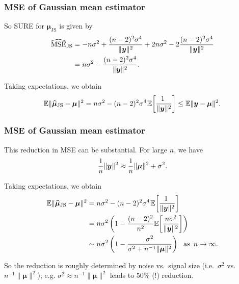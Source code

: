 \documentclass[18pt, handout]{beamer}
\newcommand{\defineTightSpacing}{%
	\setlength{\abovedisplayskip}{.25\baselineskip}%
	\setlength{\belowdisplayskip}{.25\baselineskip}%
}
\renewcommand{\textsc}[1]{{\small \MakeUppercase{#1}}}
\newcommand{\thinnerspace}{\mskip.5\thinmuskip}
\newcommand{\expectation}{\mathbb{E}}
\newcommand{\by}{\bm{y}}
\newcommand{\bmu}{\bm{\mu}}
\begin{document}
\begin{frame}
\frametitle{M{\normalsize SE} of Gaussian mean estimator}
So \textsc{SURE} for $\widehat{\bmu}_{\mathrm{JS}}$ is given by
\begin{equation*} \defineTightSpacing%
\begin{aligned}
\widehat{\operatorname{MSE}}_{\mathrm{JS}}
	&= - n \sigma^2 
		+ \frac{(n - 2)^2 \sigma^4}{\| \by \|^2}
		+ 2 n \sigma^2 
		- 2 \frac{(n - 2)^2 \sigma^4}{\| \by \|^2} \\
	&= n \sigma^2 - \frac{(n - 2)^2 \sigma^4}{\| \by \|^2}.
\end{aligned}
\end{equation*}

Taking expectations, we obtain
\begin{equation*} \defineTightSpacing%
\expectation \| \widehat{\bmu}_{\mathrm{JS}} - \bmu \|^2 
	= n \sigma^2  - (n - 2)^2 \sigma^4 \thinnerspace \expectation\!\left[ \frac{\!\!1}{\| \by \|^2} \right] 
	\leq \expectation \| \by - \bmu \|^2.
\end{equation*}
\end{frame}

\begin{frame}
\frametitle{M{\normalsize SE} of Gaussian mean estimator}
This reduction in \textsc{MSE} can be substantial.
For large $n$, we have
\begin{equation*} \defineTightSpacing%
\frac{1}{n} \| \by \|^2 \approx \frac{1}{n} \| \bmu \|^2 + \sigma^2.
\end{equation*}

Taking expectations, we obtain
\begin{equation*} \defineTightSpacing%
\begin{aligned}
\expectation \| \widehat{\bmu}_{\mathrm{JS}} - \bmu \|^2 
	&= n \sigma^2  - (n - 2)^2 \sigma^4 \thinnerspace \expectation\!\left[ \frac{\!\!1}{\| \by \|^2} \right] \\
	&= n \sigma^2 \left(
		1 - \frac{(n - 2)^2}{n^2} \expectation\!\left[ \frac{n \sigma^2}{\| \by \|^2} \right] 
	\right) \\
	&\sim n \sigma^2 \left(
		1 - \frac{\sigma^2}{\sigma^2 + n^{-1} \| \bmu \|^2} 
	\right)
	\ \text{ as } \, n \to \infty.
\end{aligned}
\end{equation*}

So the reduction is roughly determined by noise vs.\ signal size (i.e.\ $\sigma^2$ vs.\ $n^{-1} \| \bmu \|^2$);
e.g.  $\sigma^2 \approx n^{-1} \| \bmu \|^2$ leads to 50\% (!) reduction. 

\end{frame}
\end{document}
